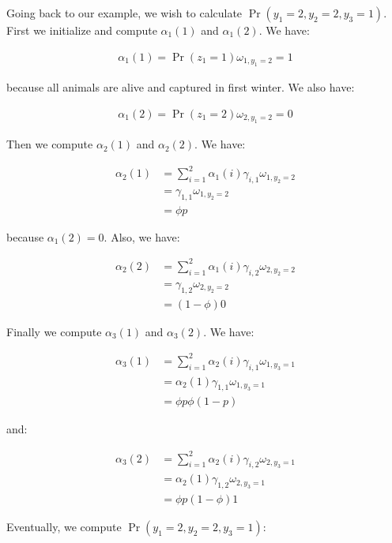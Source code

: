 \documentclass[
  12pt,
]{krantz}
\begin{document}
Going back to our example, we wish to calculate \(\Pr(y_1 = 2, y_2 = 2, y_3 = 1)\). First we initialize and compute \(\alpha_1(1)\) and \(\alpha_1(2)\). We have:

\begin{align*}
\alpha_1(1) = \Pr(z_1=1) \omega_{1,y_1=2} = 1
\end{align*}

because all animals are alive and captured in first winter. We also have:

\begin{align*}
\alpha_1(2) = \Pr(z_1=2) \omega_{2,y_1=2} = 0
\end{align*}

Then we compute \(\alpha_2(1)\) and \(\alpha_2(2)\). We have:

\begin{align*}
\alpha_2(1) &= \sum_{i=1}^2 \alpha_1(i) \gamma_{i,1} \omega_{1,y_2=2}\\
            &= \gamma_{1,1} \omega_{1,y_2=2}\\
            &= \phi p
\end{align*}

because \(\alpha_1(2) = 0\). Also, we have:

\begin{align*}
\alpha_2(2) &= \sum_{i=1}^2 \alpha_1(i) \gamma_{i,2} \omega_{2,y_2=2}\\
            &= \gamma_{1,2} \omega_{2,y_2=2}\\
            &= (1-\phi) 0
\end{align*}

Finally we compute \(\alpha_3(1)\) and \(\alpha_3(2)\). We have:

\begin{align*}
\alpha_3(1) &= \sum_{i=1}^2 \alpha_2(i) \gamma_{i,1} \omega_{1,y_3=1}\\
            &= \alpha_2(1) \gamma_{1,1} \omega_{1,y_3=1}\\
            &= \phi p \phi (1-p)
\end{align*}

and:

\begin{align*}
\alpha_3(2) &= \sum_{i=1}^2 \alpha_2(i) \gamma_{i,2} \omega_{2,y_3=1}\\
            &= \alpha_2(1) \gamma_{1,2} \omega_{2,y_3=1}\\
            &= \phi p (1-\phi) 1
\end{align*}

Eventually, we compute \(\Pr(y_1=2,y_2=2,y_3=1)\):
\end{document}
